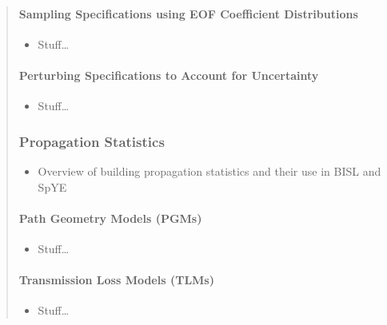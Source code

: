 \documentclass[letterpaper,10pt,english]{sphinxmanual}
\begin{document}
\begin{quote}
\begin{itemize}
\end{itemize}


\paragraph{Sampling Specifications using EOF Coefficient Distributions}
\label{\detokenize{sampling:sampling-specifications-using-eof-coefficient-distributions}}\begin{itemize}
\item {} 
Stuff…

\end{itemize}


\paragraph{Perturbing Specifications to Account for Uncertainty}
\label{\detokenize{sampling:perturbing-specifications-to-account-for-uncertainty}}\begin{itemize}
\item {} 
Stuff…

\end{itemize}


\subsubsection{Propagation Statistics}
\label{\detokenize{propagation:propagation-statistics}}\label{\detokenize{propagation:propagation}}\label{\detokenize{propagation::doc}}\begin{itemize}
\item {} 
Overview of building propagation statistics and their use in BISL and SpYE

\end{itemize}


\paragraph{Path Geometry Models (PGMs)}
\label{\detokenize{propagation:path-geometry-models-pgms}}\begin{itemize}
\item {} 
Stuff…

\end{itemize}


\paragraph{Transmission Loss Models (TLMs)}
\label{\detokenize{propagation:transmission-loss-models-tlms}}\begin{itemize}
\item {} 
Stuff…

\end{itemize}
\end{quote}
\end{document}
